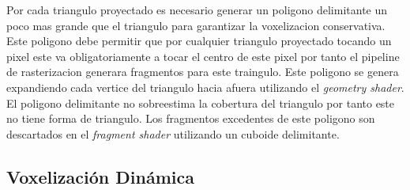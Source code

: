 Por cada triangulo proyectado es necesario generar un poligono delimitante un poco mas grande que el triangulo para garantizar la voxelizacion conservativa. Este poligono debe permitir que por cualquier triangulo proyectado tocando un pixel este va obligatoriamente a tocar el centro de este pixel por tanto el pipeline de rasterizacion generara fragmentos para este traingulo. Este poligono se genera expandiendo cada vertice del triangulo hacia afuera utilizando el \emph{geometry shader}. El poligono delimitante no sobreestima la cobertura del triangulo por tanto este no tiene forma de triangulo. Los fragmentos excedentes de este poligono son descartados en el \emph{fragment shader} utilizando un cuboide delimitante.



\subsection{Voxelización Dinámica} %
\label{sub:voxelizacion_dinamica}

